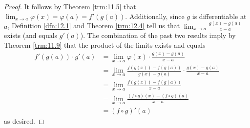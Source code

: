 \documentclass[../main.tex]{subfiles}
\begin{document}
\begin{theorem}
\begin{proof}
        It follows by Theorem \ref{trm:11.5} that $\lim_{x\to a}\varphi(x)=\varphi(a)=f'(g(a))$. Additionally, since $g$ is differentiable at $a$, Definition \ref{dfn:12.1} and Theorem \ref{trm:12.4} tell us that $\lim_{x\to a}\frac{g(x)-g(a)}{x-a}$ exists (and equals $g'(a)$). The combination of the past two results imply by Theorem \ref{trm:11.9} that the product of the limits exists and equals
        \begin{align*}
            f'(g(a))\cdot g'(a) &= \lim_{x\to a}\varphi(x)\cdot\frac{g(x)-g(a)}{x-a}\\
            &= \lim_{x\to a}\frac{f(g(x))-f(g(a))}{g(x)-g(a)}\cdot\frac{g(x)-g(a)}{x-a}\\
            &= \lim_{x\to a}\frac{f(g(x))-f(g(a))}{x-a}\\
            &= \lim_{x\to a}\frac{(f\circ g)(x)-(f\circ g)(a)}{x-a}\\
            &= (f\circ g)'(a)
        \end{align*}
        as desired.
    \end{proof}
\end{theorem}
\end{document}

